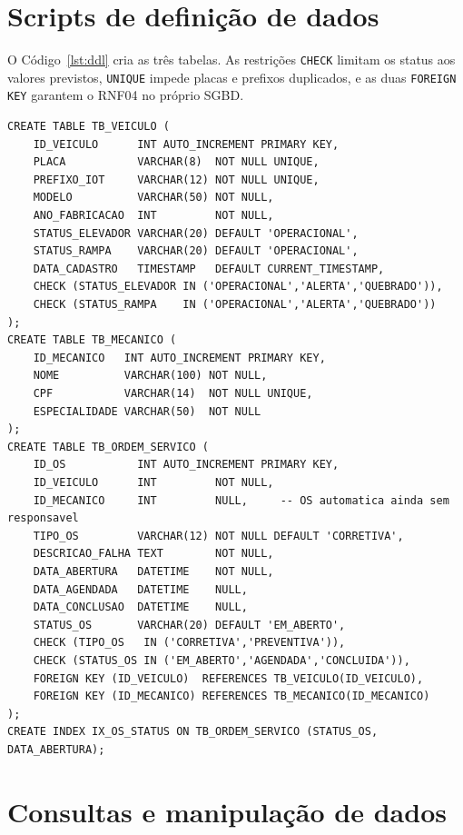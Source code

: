 \documentclass[12pt,a4paper,oneside]{report}
\newcommand{\fonte}[1]{\par\vspace{2pt}{\small Fonte: #1}\par}
\begin{document}
\section{Scripts de definição de dados}

O Código~\ref{lst:ddl} cria as três tabelas. As restrições \texttt{CHECK} limitam os status aos valores
previstos, \texttt{UNIQUE} impede placas e prefixos duplicados, e as duas \texttt{FOREIGN KEY} garantem o
RNF04 no próprio SGBD.

\begin{lstlisting}[language=SQLm,caption={DDL das tabelas do sistema},label=lst:ddl]
CREATE TABLE TB_VEICULO (
    ID_VEICULO      INT AUTO_INCREMENT PRIMARY KEY,
    PLACA           VARCHAR(8)  NOT NULL UNIQUE,
    PREFIXO_IOT     VARCHAR(12) NOT NULL UNIQUE,
    MODELO          VARCHAR(50) NOT NULL,
    ANO_FABRICACAO  INT         NOT NULL,
    STATUS_ELEVADOR VARCHAR(20) DEFAULT 'OPERACIONAL',
    STATUS_RAMPA    VARCHAR(20) DEFAULT 'OPERACIONAL',
    DATA_CADASTRO   TIMESTAMP   DEFAULT CURRENT_TIMESTAMP,
    CHECK (STATUS_ELEVADOR IN ('OPERACIONAL','ALERTA','QUEBRADO')),
    CHECK (STATUS_RAMPA    IN ('OPERACIONAL','ALERTA','QUEBRADO'))
);
CREATE TABLE TB_MECANICO (
    ID_MECANICO   INT AUTO_INCREMENT PRIMARY KEY,
    NOME          VARCHAR(100) NOT NULL,
    CPF           VARCHAR(14)  NOT NULL UNIQUE,
    ESPECIALIDADE VARCHAR(50)  NOT NULL
);
CREATE TABLE TB_ORDEM_SERVICO (
    ID_OS           INT AUTO_INCREMENT PRIMARY KEY,
    ID_VEICULO      INT         NOT NULL,
    ID_MECANICO     INT         NULL,     -- OS automatica ainda sem responsavel
    TIPO_OS         VARCHAR(12) NOT NULL DEFAULT 'CORRETIVA',
    DESCRICAO_FALHA TEXT        NOT NULL,
    DATA_ABERTURA   DATETIME    NOT NULL,
    DATA_AGENDADA   DATETIME    NULL,
    DATA_CONCLUSAO  DATETIME    NULL,
    STATUS_OS       VARCHAR(20) DEFAULT 'EM_ABERTO',
    CHECK (TIPO_OS   IN ('CORRETIVA','PREVENTIVA')),
    CHECK (STATUS_OS IN ('EM_ABERTO','AGENDADA','CONCLUIDA')),
    FOREIGN KEY (ID_VEICULO)  REFERENCES TB_VEICULO(ID_VEICULO),
    FOREIGN KEY (ID_MECANICO) REFERENCES TB_MECANICO(ID_MECANICO)
);
CREATE INDEX IX_OS_STATUS ON TB_ORDEM_SERVICO (STATUS_OS, DATA_ABERTURA);
\end{lstlisting}
\fonte{Elaborado pelo autor (2026).}

\section{Consultas e manipulação de dados}
\end{document}
